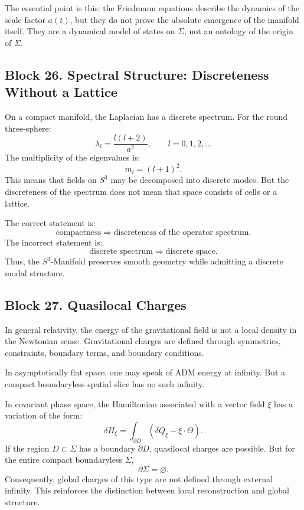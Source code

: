 \documentclass[12pt,a4paper]{article}
\theoremstyle{definition}
\begin{document}
The essential point is this: the Friedmann equations describe the dynamics of the scale factor $a(t)$, but they do not prove the absolute emergence of the manifold itself. They are a dynamical model of states on \(\Sigma\), not an ontology of the origin of \(\Sigma\).



\subsection{Block 26. Spectral Structure: Discreteness Without a Lattice}
On a compact manifold, the Laplacian has a discrete spectrum. For the round three-sphere:
\[
\lambda_l=\frac{l(l+2)}{a^2},
\qquad
l=0,1,2,\dots
\]
The multiplicity of the eigenvalues is:
\[
m_l=(l+1)^2.
\]
This means that fields on \(S^3\) may be decomposed into discrete modes. But the discreteness of the spectrum does not mean that space consists of cells or a lattice.

The correct statement is:
\[
\text{compactness}
\Rightarrow
\text{discreteness of the operator spectrum}.
\]
The incorrect statement is:
\[
\text{discrete spectrum}
\Rightarrow
\text{discrete space}.
\]
Thus, the \(S^3\)-Manifold preserves smooth geometry while admitting a discrete modal structure.



\subsection{Block 27. Quasilocal Charges}
In general relativity, the energy of the gravitational field is not a local density in the Newtonian sense. Gravitational charges are defined through symmetries, constraints, boundary terms, and boundary conditions.

In asymptotically flat space, one may speak of ADM energy at infinity. But a compact boundaryless spatial slice has no such infinity.

In covariant phase space, the Hamiltonian associated with a vector field \(\xi\) has a variation of the form:
\[
\delta H_\xi
=
\int_{\partial D}
\left(
\delta Q_\xi-\xi\cdot\Theta
\right).
\]
If the region \(D\subset\Sigma\) has a boundary \(\partial D\), quasilocal charges are possible. But for the entire compact boundaryless \(\Sigma\),
\[
\partial\Sigma=\varnothing.
\]
Consequently, global charges of this type are not defined through external infinity. This reinforces the distinction between local reconstruction and global structure.
\end{document}
